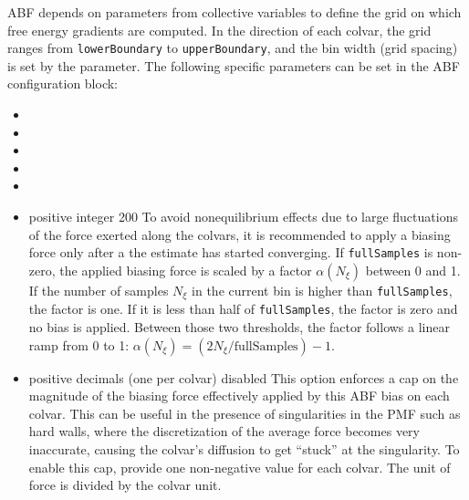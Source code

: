 
ABF depends on parameters from collective variables to define the grid on which free
energy gradients are computed. In the direction of each colvar, the grid ranges from
\texttt{lowerBoundary} to \texttt{upperBoundary}, and the bin width (grid spacing)
is set by the  parameter.
The following specific parameters can be set in the ABF configuration block:

\begin{itemize}

\item {}
\item {}
\item {}
\item {}
\item {}

\item {}
  {positive integer}
  {200}
  {To avoid nonequilibrium effects due to large fluctuations of the force exerted along the
   colvars, it is recommended to apply a biasing force only after a the estimate has started
   converging. If \texttt{fullSamples} is non-zero, the applied biasing force is scaled by a factor
   $\alpha(N_\xi)$ between 0 and 1.
   If the number of samples $N_\xi$ in the current bin is higher than \texttt{fullSamples},
   the factor is one. If it is less than half of \texttt{fullSamples}, the factor is zero and
   no bias is applied. Between those two thresholds, the factor follows a linear ramp from
   0 to 1: $\alpha(N_\xi) =(2N_\xi/\mathrm{fullSamples})-1$}.

\item {}
  {positive decimals (one per colvar)}
  {disabled}
  {This option enforces a cap on the magnitude of the biasing force effectively applied
   by this ABF bias on each colvar. This can be useful in the presence of singularities
   in the PMF such as hard walls, where the discretization of the average force becomes
   very inaccurate, causing the colvar's diffusion to get ``stuck'' at the singularity.
   To enable this cap, provide one non-negative value for each colvar. The unit of force
   is  divided by the colvar unit.}


\end{itemize}
